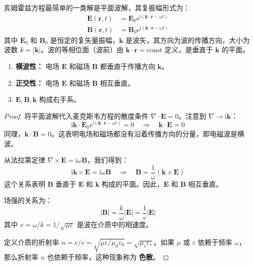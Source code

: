 \documentclass[fontset=none]{ctexart}
\begin{document}
\begin{definition}[平面电磁波]
亥姆霍兹方程最简单的一类解是平面波解，其复振幅形式为：
\begin{equation}
\begin{aligned}
\bm{E}(\bm{r}, t) &= \bm{E}_0 \mathrm{e}^{\mathrm{i}(\bm{k} \cdot \bm{r} - \omega t)} \\
\bm{B}(\bm{r}, t) &= \bm{B}_0 \mathrm{e}^{\mathrm{i}(\bm{k} \cdot \bm{r} - \omega t)}
\end{aligned}
\end{equation}
其中 $\bm{E}_0$ 和 $\bm{B}_0$ 是恒定的复矢量振幅，$\bm{k}$ 是波矢，其方向为波的传播方向，大小为波数 $k=|\bm{k}|$。波的等相位面（波前）由 $\bm{k} \cdot \bm{r} = \text{const}$ 定义，是垂直于 $\bm{k}$ 的平面。
\end{definition}

\begin{theorem}[平面电磁波的性质]
\begin{enumerate}
    \item \textbf{横波性：} 电场 $\bm{E}$ 和磁场 $\bm{B}$ 都垂直于传播方向 $\bm{k}$。
    \item \textbf{正交性：} 电场 $\bm{E}$ 和磁场 $\bm{B}$ 相互垂直。
    \item $\bm{E}, \bm{B}, \bm{k}$ 构成右手系。
\end{enumerate}
\end{theorem}
\begin{proof}
将平面波解代入麦克斯韦方程的散度条件 $\nabla \cdot \bm{E}=0$。注意到 $\nabla \to \mathrm{i}\bm{k}$：
\begin{equation}
\mathrm{i}\bm{k} \cdot \bm{E}_0 \mathrm{e}^{\mathrm{i}(\bm{k} \cdot \bm{r} - \omega t)} = 0 \quad \Rightarrow \quad \bm{k} \cdot \bm{E} = 0
\end{equation}
同理，$\bm{k} \cdot \bm{B} = 0$。这表明电场和磁场都没有沿着传播方向的分量，即电磁波是横波。

从法拉第定律 $\nabla \times \bm{E} = \mathrm{i}\omega\bm{B}$，我们得到：
\begin{equation}
\mathrm{i}\bm{k} \times \bm{E} = \mathrm{i}\omega\bm{B} \quad \Rightarrow \quad \bm{B} = \frac{1}{\omega}(\bm{k} \times \bm{E})
\end{equation}
这个关系表明 $\bm{B}$ 垂直于 $\bm{E}$ 和 $\bm{k}$ 构成的平面。因此，$\bm{E}$ 和 $\bm{B}$ 相互垂直。

场强的关系为：
\begin{equation}
|\bm{B}| = \frac{k}{\omega} |\bm{E}| = \frac{1}{v} |\bm{E}|
\end{equation}
其中 $v = \omega/k = 1/\sqrt{\mu\varepsilon}$ 是波在介质中的相速度。

定义介质的折射率 $n = c/v = \sqrt{\mu\varepsilon/\mu_0\varepsilon_0} = \sqrt{\mu_r \varepsilon_r}$。如果 $\mu$ 或 $\varepsilon$ 依赖于频率 $\omega$，那么折射率 $n$ 也依赖于频率，这种现象称为 \textbf{色散}。
\end{proof}
\end{document}
